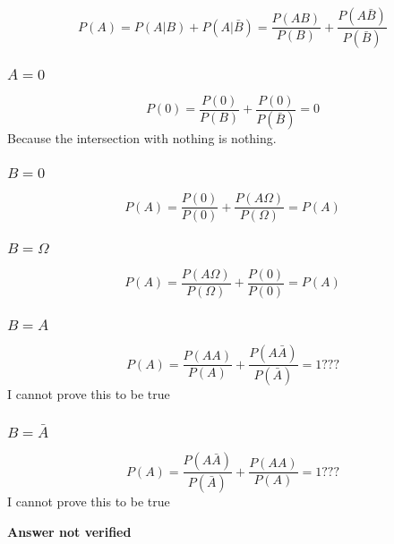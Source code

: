 \subsection{}
\begin{equation}
	P(A) = P(A|B) +  P(A|\bar{B}) = \frac{P(AB)}{P(B)} + \frac{P(A\bar{B})}{P(\bar{B})}
\end{equation}

\subsubsection{$A=0$}
\begin{equation}
	P(0) = \frac{P(0)}{P(B)} + \frac{P(0)}{P(\bar{B})} = 0
\end{equation}
Because the intersection with nothing is nothing.


\subsubsection{$B=0$}
\begin{equation}
	P(A) = \frac{P(0)}{P(0)} + \frac{P(A\Omega)}{P(\Omega)} = P(A)
\end{equation}

\subsubsection{$B=\Omega$}
\begin{equation}
	P(A) = \frac{P(A\Omega)}{P(\Omega)} + \frac{P(0)}{P(0)} = P(A)
\end{equation}


\subsubsection{$B=A$}
\begin{equation}
	P(A) = \frac{P(AA)}{P(A)} + \frac{P(A\bar{A})}{P(\bar{A})} = 1 ???
\end{equation}
I cannot prove this to be true

\subsubsection{$B=\bar{A}$}
\begin{equation}
	P(A) = \frac{P(A\bar{A})}{P(\bar{A})} + \frac{P(AA)}{P(A)} = 1 ???
\end{equation}
I cannot prove this to be true

\textbf{Answer not verified}

